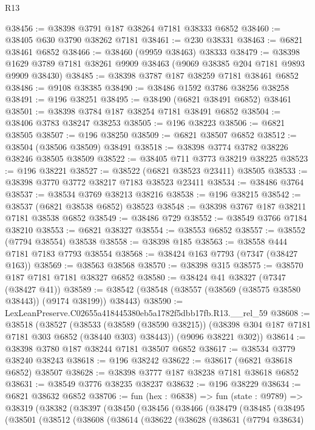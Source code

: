 \begin{lexlean}{R13}
\begin{coremodule}
@38456 := @38398 @3791 @187 @38264 @7181 @38333 @6852
@38460 := @38405 @630 @3790 @38262 @7181
@38461 := @230 @38331
@38463 := @6821 @38461 @6852
@38466 := @38460 (@9959 @38463) @38333
@38479 := @38398 @1629 @3789 @7181 @38261 @9909 @38463 (@9069 @38385 @204 @7181 @9893 @9909 @38430)
@38485 := @38398 @3787 @187 @38259 @7181 @38461 @6852
@38486 := @9108 @38385
@38490 := @38486 @1592 @3786 @38256 @38258
@38491 := @196 @38251
@38495 := @38490 (@6821 @38491 @6852) @38461
@38501 := @38398 @3784 @187 @38254 @7181 @38491 @6852
@38504 := @38406 @3783 @38247 @38253
@38505 := @196 @38223
@38506 := @6821 @38505
@38507 := @196 @38250
@38509 := @6821 @38507 @6852
@38512 := @38504 (@38506 @38509) @38491
@38518 := @38398 @3774 @3782 @38226 @38246 @38505 @38509
@38522 := @38405 @711 @3773 @38219 @38225
@38523 := @196 @38221
@38527 := @38522 (@6821 @38523 @23411) @38505
@38533 := @38398 @3770 @3772 @38217 @7183 @38523 @23411
@38534 := @38486 @3764
@38537 := @38534 @3769 @38213 @38216
@38538 := @196 @38215
@38542 := @38537 (@6821 @38538 @6852) @38523
@38548 := @38398 @3767 @187 @38211 @7181 @38538 @6852
@38549 := @38486 @729
@38552 := @38549 @3766 @7184 @38210
@38553 := @6821 @38327
@38554 := @38553 @6852
@38557 := @38552 (@7794 @38554) @38538
@38558 := @38398 @185
@38563 := @38558 @444 @7181 @7183 @7793 @38554
@38568 := @38424 @163 @7793 (@7347 (@38427 @163))
@38569 := @38563 @38568
@38570 := @38398 @315
@38575 := @38570 @187 @7181 @7181 @38327 @6852
@38580 := @38424 @41 @38327 (@7347 (@38427 @41))
@38589 := @38542 (@38548 (@38557 (@38569 (@38575 @38580 @38443)) (@9174 @38199)) @38443)
@38590 := LexLeanPreserve.C02655a418445380eb5a1782f5dbb17fb.R13.__rel_59
@38608 := @38518
    (@38527
      (@38533
        (@38589 (@38590 @38215))
        (@38398 @304 @187 @7181 @7181 @303 @6852 (@38440 @303) @38443))
      (@9096 @38221 @302))
@38614 := @38398 @3780 @187 @38244 @7181 @38507 @6852
@38617 := @38534 @3779 @38240 @38243
@38618 := @196 @38242
@38622 := @38617 (@6821 @38618 @6852) @38507
@38628 := @38398 @3777 @187 @38238 @7181 @38618 @6852
@38631 := @38549 @3776 @38235 @38237
@38632 := @196 @38229
@38634 := @6821 @38632 @6852
@38706 := fun (hex : @6838) =>
  fun (state : @9789) =>
  @38319
    (@38382
      (@38397
        (@38450
          (@38456
            (@38466
              (@38479
                (@38485
                  (@38495
                    (@38501
                      (@38512
                        (@38608
                          (@38614
                            (@38622
                              (@38628
                                (@38631
                                  (@7794 @38634)

\end{coremodule}
\end{lexlean}
